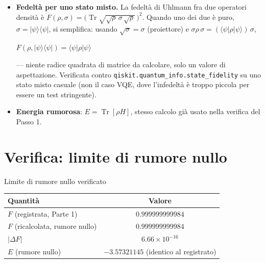 \documentclass[11pt,a4paper]{article}
\newcommand{\Tr}{\operatorname{Tr}}
\newcommand{\ket}[1]{\lvert #1 \rangle}
\newcommand{\bra}[1]{\langle #1 \rvert}
\begin{document}
\begin{itemize}[leftmargin=1.3em,itemsep=0.3em]
sfera di Bloch uniformemente in ogni direzione, Fig.~2 di
\texttt{teoria\_modello\_rumore.tex}) --- un rumore di questo tipo è
tipicamente poco compensabile riaggiustando i parametri, a differenza di
un errore sistematico/coerente; ci si aspetterebbe quindi che un VQE
noise-aware non cambi granché rispetto ai risultati di questo Passo, ma è
una previsione da verificare, non un fatto acquisito.
\item \textbf{Fedeltà per uno stato misto.} La fedeltà di Uhlmann fra due
operatori densità è $F(\rho,\sigma)=\big(\Tr\sqrt{\sqrt\rho\,\sigma\,\sqrt\rho}\,\big)^2$.
Quando uno dei due è puro, $\sigma=\ket\psi\bra\psi$, si semplifica: usando
$\sqrt\sigma=\sigma$ (proiettore) e $\sigma\rho\,\sigma=(\bra\psi\rho\ket\psi)\,\sigma$,
\begin{keyeq}
\centering
$F(\rho,\ket\psi\bra\psi) = \bra\psi\rho\ket\psi$
\end{keyeq}
--- niente radice quadrata di matrice da calcolare, solo un valore di
aspettazione. Verificata contro \texttt{qiskit.quantum\_info.state\_fidelity}
su uno stato misto casuale (non il caso VQE, dove l'infedeltà è troppo
piccola per essere un test stringente).
\item \textbf{Energia rumorosa}: $E=\Tr[\rho H]$, stesso calcolo già usato
nella verifica del Passo 1.
\end{itemize}

\section*{Verifica: limite di rumore nullo}

\begin{okbox}{Limite di rumore nullo verificato}
\begin{center}
\renewcommand{\arraystretch}{1.25}
\begin{tabular}{@{}lc@{}}
\toprule
\textbf{Quantità} & \textbf{Valore}\\
\midrule
$F$ (registrata, Parte 1) & $0.999999999984$\\
$F$ (ricalcolata, rumore nullo) & $0.999999999984$\\
$|\Delta F|$ & $6.66\times10^{-16}$\\
$E$ (rumore nullo) & $-3.57321145$ (identico al registrato)\\
\bottomrule
\end{tabular}
\end{center}
\end{okbox}
\end{document}
